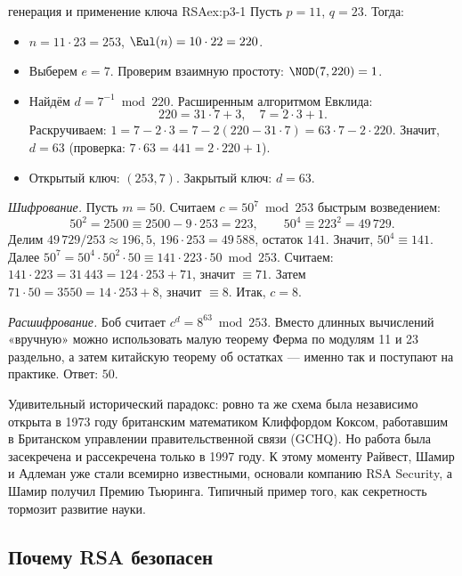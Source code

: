 \begin{example}{генерация и применение ключа RSA}{ex:p3-1}
Пусть $p = 11$, $q = 23$. Тогда:
\begin{itemize}
  \item $n = 11\cdot 23 = 253$, $\Eul(n) = 10\cdot 22 = 220$.
  \item Выберем $e = 7$. Проверим взаимную простоту: $\NOD(7, 220) = 1$.
  \item Найдём $d = 7^{-1} \bmod 220$. Расширенным алгоритмом Евклида:
  \[
  220 = 31\cdot 7 + 3,\quad 7 = 2\cdot 3 + 1.
  \]
  Раскручиваем: $1 = 7 - 2\cdot 3 = 7 - 2(220 - 31\cdot 7) = 63\cdot 7 - 2\cdot 220$. Значит, $d = 63$ (проверка: $7\cdot 63 = 441 = 2\cdot 220 + 1$).
  \item Открытый ключ: $(253, 7)$. Закрытый ключ: $d = 63$.
\end{itemize}

\emph{Шифрование.} Пусть $m = 50$. Считаем $c = 50^7 \bmod 253$ быстрым возведением:
\[
50^2 = 2500 \equiv 2500 - 9\cdot 253 = 223,\qquad 50^4 \equiv 223^2 = 49\,729.
\]
Делим $49\,729 / 253 \approx 196{,}5$, $196\cdot 253 = 49\,588$, остаток $141$. Значит, $50^4 \equiv 141$. Далее $50^7 = 50^4\cdot 50^2\cdot 50 \equiv 141\cdot 223\cdot 50 \bmod 253$. Считаем: $141\cdot 223 = 31\,443 = 124\cdot 253 + 71$, значит $\equiv 71$. Затем $71\cdot 50 = 3550 = 14\cdot 253 + 8$, значит $\equiv 8$. Итак, $c = 8$.

\emph{Расшифрование.} Боб считает $c^d = 8^{63} \bmod 253$. Вместо длинных вычислений «вручную» можно использовать малую теорему Ферма по модулям 11 и 23 раздельно, а затем китайскую теорему об остатках --- именно так и поступают на практике. Ответ: $50$.
\end{example}

\begin{interestbox}
Удивительный исторический парадокс: ровно та же схема была независимо открыта в 1973 году британским математиком Клиффордом Коксом, работавшим в Британском управлении правительственной связи (GCHQ). Но работа была засекречена и рассекречена только в 1997 году. К этому моменту Райвест, Шамир и Адлеман уже стали всемирно известными, основали компанию RSA Security, а Шамир получил Премию Тьюринга. Типичный пример того, как секретность тормозит развитие науки.
\end{interestbox}

\subsection{Почему RSA безопасен}

